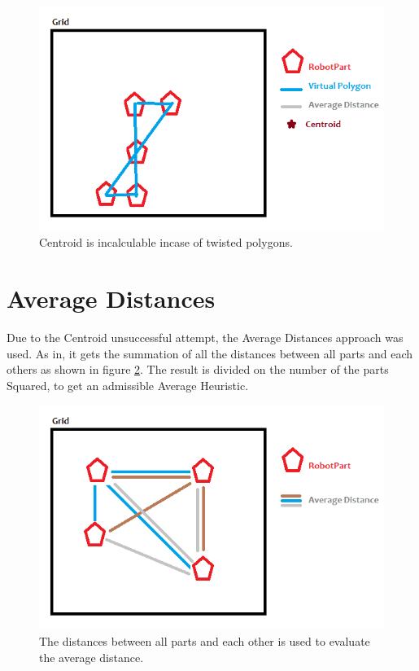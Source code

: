 \begin{figure}[H] 
   	\centering
	\includegraphics[scale=0.6]{images/twistedcentroid} 
    \caption{Centroid is incalculable incase of twisted polygons. }
    \label{fig:twistedcentroid} 
\end{figure}


\section{Average Distances}

Due to the Centroid unsuccessful attempt, the Average Distances approach was used. As in, it gets the summation of all the distances between all parts and each others as shown in figure \ref{fig:averagedistance}. The result is divided on the number of the parts Squared, to get an admissible Average Heuristic.

\begin{figure}[H] 
   	\centering
	\includegraphics[scale=0.6]{images/averagedistance} 
    \caption{The distances between all parts and each other is used to evaluate the average distance. }
    \label{fig:averagedistance} 
\end{figure}

